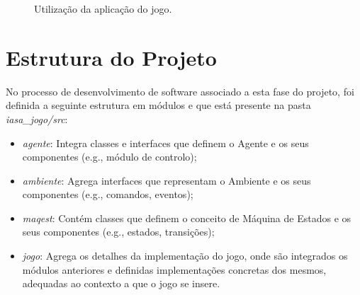 \begin{figure}[H]
    \begin{center}
    \end{center}
    \caption{Utilização da aplicação do jogo.}\label{fig:projeto-parte1-jogo}
\end{figure}


\section{Estrutura do Projeto}\label{sec:estrutura-do-projeto}

No processo de desenvolvimento de software associado a esta fase do projeto, foi definida a seguinte estrutura em módulos e que está presente na pasta \textit{iasa\_jogo/src}:

\begin{itemize}
    \item \textit{agente}: Integra classes e interfaces que definem o Agente e os seus componentes (e.g., módulo de controlo);
    \item \textit{ambiente}: Agrega interfaces que representam o Ambiente e os seus componentes (e.g., comandos, eventos);
    \item \textit{maqest}: Contém classes que definem o conceito de Máquina de Estados e os seus componentes (e.g., estados, transições);
    \item \textit{jogo}: Agrega os detalhes da implementação do jogo, onde são integrados os módulos anteriores e definidas implementações concretas dos mesmos, adequadas ao contexto a que o jogo se insere.
\end{itemize}
